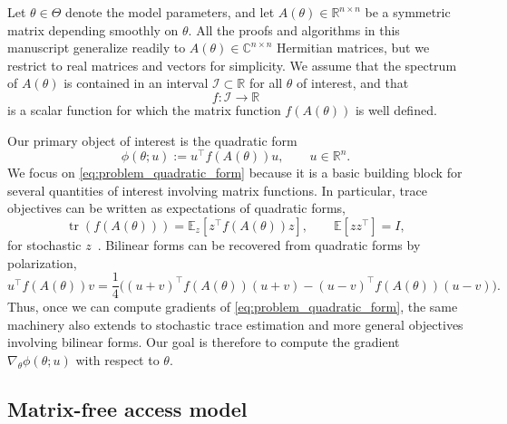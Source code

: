 \documentclass{article}
\begin{document}
Let $\theta \in \Theta$ denote the model parameters, and let $
A(\theta) \in \mathbb{R}^{n \times n}$ be a symmetric matrix depending smoothly on $\theta$. All the proofs and algorithms in this manuscript generalize readily to $A(\theta) \in \mathbb{C}^{n \times n}$ Hermitian matrices, but we restrict to real
matrices and vectors for simplicity. We assume that the spectrum of $A(\theta)$ is contained in an interval
$\mathcal I \subset \mathbb{R}$ for all $\theta$ of interest, and that
\begin{equation*}
f : \mathcal I \to \mathbb{R}
\end{equation*}
is a scalar function for which the matrix function $f(A(\theta))$ is well defined.

 


Our primary object of interest is the quadratic form
\begin{equation}
\phi(\theta;u) := u^\top f(A(\theta))u,
\qquad u \in \mathbb{R}^n.
\label{eq:problem_quadratic_form}
\end{equation}
We focus on \eqref{eq:problem_quadratic_form} because it is a basic building block for several
quantities of interest involving matrix functions. In particular, trace objectives can be written as
expectations of quadratic forms,
\begin{equation}
\operatorname{tr}(f(A(\theta)))
= \mathbb E_z\!\left[z^\top f(A(\theta)) z\right],
\qquad \mathbb E[zz^\top]=I,
\label{eq:problem_trace_identity}
\end{equation}
for stochastic $z$~\citep{hutchinson1989stochastic}. Bilinear forms can be recovered from quadratic forms by polarization,
\begin{equation}
u^\top f(A(\theta))v
=
\frac14\Big((u+v)^\top f(A(\theta))(u+v)
-
(u-v)^\top f(A(\theta))(u-v)\Big).
\label{eq:problem_polarization}
\end{equation}
Thus, once we can compute gradients of \eqref{eq:problem_quadratic_form}, the same machinery also
extends to stochastic trace estimation and more general objectives involving bilinear forms. Our goal is therefore to compute the gradient $\nabla_\theta \phi(\theta;u)$  with respect to $\theta$.


\subsection{Matrix-free access model}
\end{document}
